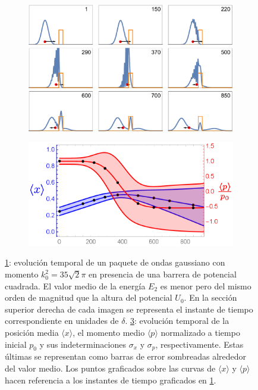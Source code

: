 \documentclass[aps,prb,twocolumn,superscriptaddress,floatfix,longbibliography]{revtex4-2}
\begin{document}
\begin{figure}
     \centering
     \begin{subfigure}[b]{0.45\textwidth}
         \centering
         \includegraphics[width=\textwidth]{evolution_2ii.pdf}
         \caption{\label{fig:evolution_2ii}}
     \end{subfigure}
     \hfill
     \begin{subfigure}[b]{0.45\textwidth}
         \centering
         \includegraphics[width=\textwidth]{valores_medios_2ii.png}
         \caption{\label{fig:valores_medios_2ii}}
     \end{subfigure}
     \caption{\ref{fig:evolution_2ii}: evolución temporal de un paquete de ondas gaussiano con momento $k_0^2 = 35 \sqrt{2} \pi$  en presencia de una barrera de potencial cuadrada. El valor medio de la energía $E_2$ es menor pero del mismo orden de magnitud que la altura del potencial $U_0$. En la sección superior derecha de cada imagen se representa el instante de tiempo correspondiente en unidades de $\delta$. \ref{fig:valores_medios_2ii}: evolución temporal de la posición media $\langle x \rangle$, el momento medio $\langle p \rangle$ normalizado a tiempo inicial $p_0$ y sus indeterminaciones $\sigma_x$ y $\sigma_p$, respectivamente. Estas últimas se representan como barras de error sombreadas alrededor del valor medio. Los puntos graficados sobre las curvas de $\langle x \rangle$ y $\langle p \rangle$ hacen referencia a los instantes de tiempo graficados en \ref{fig:evolution_2ii}.}
\end{figure}
\end{document}

